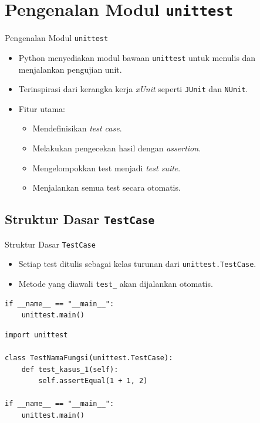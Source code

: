 \documentclass[aspectratio=169, table]{beamer}
\begin{document}
\section{Pengenalan Modul \texttt{unittest}}
\begin{frame}[fragile]{Pengenalan Modul \texttt{unittest}}
\vspace*{10pt}
\begin{itemize}
  \item Python menyediakan modul bawaan \texttt{unittest} untuk menulis dan menjalankan pengujian unit.
  \item Terinspirasi dari kerangka kerja \textit{xUnit} seperti \texttt{JUnit} dan \texttt{NUnit}.
  \item Fitur utama:
  \begin{itemize}
    \item Mendefinisikan \textit{test case}.
    \item Melakukan pengecekan hasil dengan \textit{assertion}.
    \item Mengelompokkan test menjadi \textit{test suite}.
    \item Menjalankan semua test secara otomatis.
  \end{itemize}
\end{itemize}
\end{frame}

\subsection{Struktur Dasar \texttt{TestCase}}

\begin{frame}[fragile]{Struktur Dasar \texttt{TestCase}}
\vspace{20pt}
\begin{itemize}
  \item Setiap test ditulis sebagai kelas turunan dari \texttt{unittest.TestCase}.
  \item Metode yang diawali \texttt{test\_} akan dijalankan otomatis.
\end{itemize}

\begin{lstlisting}[style=PythonStyle, caption={Blok eksekusi test bawaan}]
if __name__ == "__main__":
    unittest.main()
\end{lstlisting}
\vspace{-10pt}
\begin{lstlisting}[style=PythonStyle, caption={Struktur dasar kelas unit test di Python}]
import unittest

class TestNamaFungsi(unittest.TestCase):
    def test_kasus_1(self):
        self.assertEqual(1 + 1, 2)

if __name__ == "__main__":
    unittest.main()
\end{lstlisting}
\end{frame}
\end{document}
